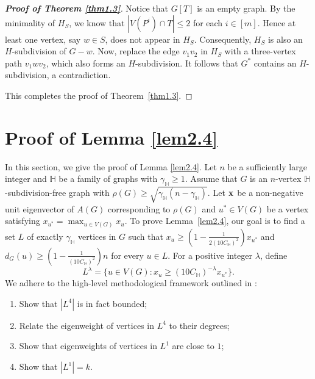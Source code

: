 \documentclass[11pt, a4paper]{article}
\theoremstyle{definition}
\newcommand{\<}{\subseteq}
\begin{document}
\begin{proof}[\bf Proof of Theorem \ref{thm1.3}]
   Notice that $G[T]$ is an empty graph. By the minimality of $H_S$, we know that $|V(P^i)\cap T|\leq 2$ for each $i\in [m]$. Hence at least one vertex, say $w\in S$, does not appear in $H_S$. Consequently, $H_{S}$ is also an $H$-subdivision of $G-w$.
    Now, replace the edge $v_1v_2$ in $H_S$ with a three-vertex path $v_1wv_2$, which also forms an $H$-subdivision. It follows that $G^*$ contains an $H$-subdivision, a contradiction.
    
    This completes the proof of Theorem~\ref{thm1.3}.
\end{proof}


\section{Proof of Lemma \ref{lem2.4}}\label{sec4}

In this section, we give the proof of Lemma \ref{lem2.4}. Let $n$ be a sufficiently large integer and $\mathbb{H}$ be a family of graphs with $\gamma_{\mathbb{H}}\geq 1$.  Assume that $G$ is an $n$-vertex $\mathbb{H}$-subdivision-free graph with $\rho(G) \geq \sqrt{\gamma_\mathbb{H}(n-\gamma_\mathbb{H})}$.  Let ${\bf x}$ be a non-negative unit eigenvector of $A(G)$ corresponding to $\rho(G)$ and  $u^{*} \in V(G)$ be a vertex satisfying $x_{u^{*}}=\max_{u \in V(G)}x_{u}$.
To prove Lemma~\ref{lem2.4}, our goal is to find a set $L$ of exactly $\gamma_\mathbb{H}$ vertices in $G$ such that $x_{u} \geq (1-\frac{1}{2(10C_\mathbb{H})^{2}})x_{u^{*}}$ and $d_{G}(u) \geq (1-\frac{1}{(10C_\mathbb{H})^{2}})n$ for every $u \in L$.
For a positive integer $\lambda$,  define %
$$
L^\lambda=\{u\in V(G):x_{u}\geq (10C_\mathbb{H})^{-\lambda}x_{u^*}\}. 
$$
We adhere to the high-level methodological framework outlined in \cite{byrne2024general}:
\begin{enumerate}
    \item Show that $|L^4|$ is in fact bounded;
    \item Relate the eigenweight of vertices in $L^4$ to their degrees;
    \item Show that eigenweights of vertices in $L^1$  are close to $1$;
    \item Show that $|L^1|=k$.
\end{enumerate}
\end{document}

